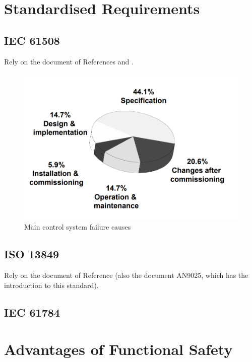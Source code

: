 \documentclass[conference]{IEEEtran}
\begin{document}
\section{Standardised Requirements}

\subsection{IEC 61508}

Rely on the document of References \cite{bell_introduction_nodate} and \cite{meany_functional_2017}.

\begin{figure}[htbp]
\centerline{\includegraphics[scale=.33]{61508_SysFail.png}}
\caption{Main control system failure causes \cite{bell_introduction_nodate}}
\label{timeline}
\end{figure}

\subsection{ISO 13849}

Rely on the document of Reference \cite{meany_functional_2017} (also the document AN9025, which has the introduction to this standard).

\subsection{IEC 61784}

\section{Advantages of Functional Safety}
\end{document}
